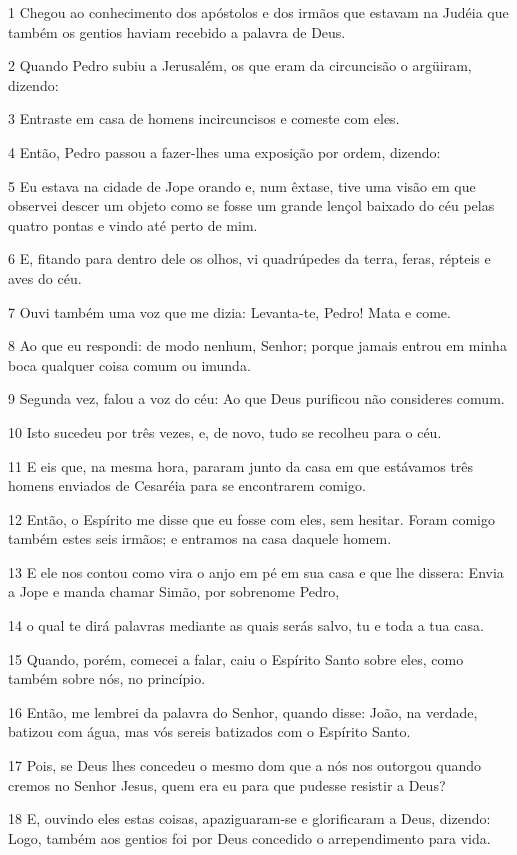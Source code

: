 \par 1 Chegou ao conhecimento dos apóstolos e dos irmãos que estavam na Judéia que também os gentios haviam recebido a palavra de Deus.
\par 2 Quando Pedro subiu a Jerusalém, os que eram da circuncisão o argüiram, dizendo:
\par 3 Entraste em casa de homens incircuncisos e comeste com eles.
\par 4 Então, Pedro passou a fazer-lhes uma exposição por ordem, dizendo:
\par 5 Eu estava na cidade de Jope orando e, num êxtase, tive uma visão em que observei descer um objeto como se fosse um grande lençol baixado do céu pelas quatro pontas e vindo até perto de mim.
\par 6 E, fitando para dentro dele os olhos, vi quadrúpedes da terra, feras, répteis e aves do céu.
\par 7 Ouvi também uma voz que me dizia: Levanta-te, Pedro! Mata e come.
\par 8 Ao que eu respondi: de modo nenhum, Senhor; porque jamais entrou em minha boca qualquer coisa comum ou imunda.
\par 9 Segunda vez, falou a voz do céu: Ao que Deus purificou não consideres comum.
\par 10 Isto sucedeu por três vezes, e, de novo, tudo se recolheu para o céu.
\par 11 E eis que, na mesma hora, pararam junto da casa em que estávamos três homens enviados de Cesaréia para se encontrarem comigo.
\par 12 Então, o Espírito me disse que eu fosse com eles, sem hesitar. Foram comigo também estes seis irmãos; e entramos na casa daquele homem.
\par 13 E ele nos contou como vira o anjo em pé em sua casa e que lhe dissera: Envia a Jope e manda chamar Simão, por sobrenome Pedro,
\par 14 o qual te dirá palavras mediante as quais serás salvo, tu e toda a tua casa.
\par 15 Quando, porém, comecei a falar, caiu o Espírito Santo sobre eles, como também sobre nós, no princípio.
\par 16 Então, me lembrei da palavra do Senhor, quando disse: João, na verdade, batizou com água, mas vós sereis batizados com o Espírito Santo.
\par 17 Pois, se Deus lhes concedeu o mesmo dom que a nós nos outorgou quando cremos no Senhor Jesus, quem era eu para que pudesse resistir a Deus?
\par 18 E, ouvindo eles estas coisas, apaziguaram-se e glorificaram a Deus, dizendo: Logo, também aos gentios foi por Deus concedido o arrependimento para vida.
